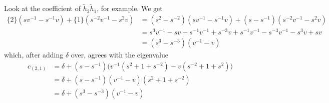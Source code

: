 Look at the coefficient of $\tilde{h}_2 \tilde{h}_1$, for example. We get
\begin{align*}
\{ 2 \} (s v^{-1} - s^{-1} v ) + \{ 1 \} ( s^{-2} v^{-1} - s^2 v ) &= ( s^2 - s^{-2} ) ( s v^{-1} - s^{-1} v ) + ( s - s^{-1} ) ( s^{-2} v^{-1} - s^2 v ) \\
&= s^3 v^{-1} - s v - s^{-1} v^{-1} + s^{-3} v + s^{-1} v^{-1} - s^{-3} v^{-1} - s^3 v + s v \\
&= ( s^3 - s^{-3} ) ( v^{-1} - v )
\end{align*}
which, after adding $\delta$ over, agrees with the eigenvalue 
\begin{align*}
c_{(2, 1)} &= \delta + ( s - s^{-1} ) \big( v^{-1} ( s^2 + 1 + s^{-2} ) - v ( s^{-2} + 1 + s^2 ) \big) \\
&= \delta + ( s - s^{-1} ) ( v^{-1} - v ) ( s^2 + 1 + s^{-2} ) \\
&= \delta + ( s^3 - s^{-3} ) ( v^{-1} - v )
\end{align*}
